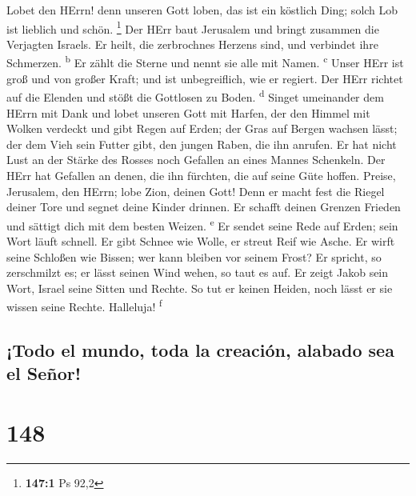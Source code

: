  Lobet den HErrn! denn unseren Gott loben, das ist ein
köstlich Ding; solch Lob ist lieblich und schön. \footnote{\textbf{147:1}
  Ps 92,2}  Der HErr baut Jerusalem und bringt zusammen
die Verjagten Israels.  Er heilt, die zerbrochnes Herzens
sind, und verbindet ihre Schmerzen. \textsuperscript{b} 
Er zählt die Sterne und nennt sie alle mit Namen. \textsuperscript{c}
 Unser HErr ist groß und von großer Kraft; und ist
unbegreiflich, wie er regiert.  Der HErr richtet auf die
Elenden und stößt die Gottlosen zu Boden. \textsuperscript{d}
 Singet umeinander dem HErrn mit Dank und lobet unseren
Gott mit Harfen,  der den Himmel mit Wolken verdeckt und
gibt Regen auf Erden; der Gras auf Bergen wachsen lässt; 
der dem Vieh sein Futter gibt, den jungen Raben, die ihn anrufen.
 Er hat nicht Lust an der Stärke des Rosses noch Gefallen
an eines Mannes Schenkeln.  Der HErr hat Gefallen an
denen, die ihn fürchten, die auf seine Güte hoffen. 
Preise, Jerusalem, den HErrn; lobe Zion, deinen Gott! 
Denn er macht fest die Riegel deiner Tore und segnet deine Kinder
drinnen.  Er schafft deinen Grenzen Frieden und sättigt
dich mit dem besten Weizen. \textsuperscript{e}  Er
sendet seine Rede auf Erden; sein Wort läuft schnell.  Er
gibt Schnee wie Wolle, er streut Reif wie Asche.  Er
wirft seine Schloßen wie Bissen; wer kann bleiben vor seinem Frost?
 Er spricht, so zerschmilzt es; er lässt seinen Wind
wehen, so taut es auf.  Er zeigt Jakob sein Wort, Israel
seine Sitten und Rechte.  So tut er keinen Heiden, noch
lässt er sie wissen seine Rechte. Halleluja! \textsuperscript{f}

\hypertarget{todo-el-mundo-toda-la-creaciuxf3n-alabado-sea-el-seuxf1or}{%
\subsection{¡Todo el mundo, toda la creación, alabado sea el
Señor!}\label{todo-el-mundo-toda-la-creaciuxf3n-alabado-sea-el-seuxf1or}}

\hypertarget{section-147}{%
\section{148}\label{section-147}}

